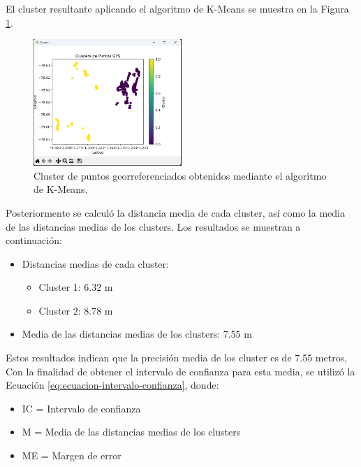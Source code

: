 El cluster resultante aplicando el algoritmo de K-Means se muestra en la Figura \ref{fig:cluster-georreferenciacion}.

\begin{figure}[H]
    \centering
    \includegraphics[width=0.5\textwidth]{chapters/III-resultados-y-discusion/resources/images/cluster-georreferenciacion.png}
    \caption{Cluster de puntos georreferenciados obtenidos mediante el algoritmo de K-Means.}
    \label{fig:cluster-georreferenciacion}
\end{figure}

Posteriormente se calculó la distancia media de cada cluster, así como la media de las distancias medias de los clusters. Los resultados
se muestran a continuación:

\begin{itemize}
    \item Distancias medias de cada cluster:
          \begin{itemize}
              \item Cluster 1: 6.32 m
              \item Cluster 2: 8.78 m
          \end{itemize}
    \item Media de las distancias medias de los clusters: 7.55 m
\end{itemize}

Estos resultados indican que la precisión media de los cluster es de 7.55 metros, Con la finalidad de obtener el intervalo de
confianza para esta media, se utilizó la Ecuación \ref{eq:ecuacion-intervalo-confianza}, donde:

\begin{itemize}
    \item IC = Intervalo de confianza
    \item M = Media de las distancias medias de los clusters
    \item ME = Margen de error
\end{itemize}

